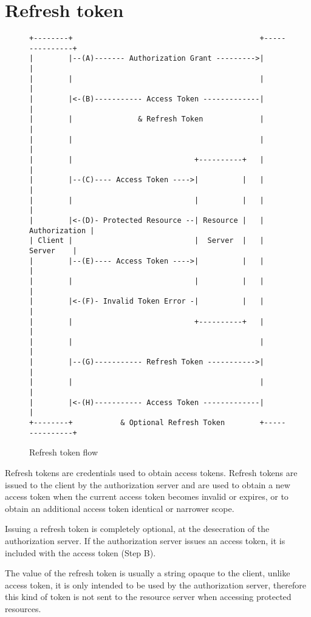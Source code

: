 \section{Refresh token}
\begin{figure}[h]
    \centering
    \begin{BVerbatim}
+--------+                                           +---------------+
|        |--(A)------- Authorization Grant --------->|               |
|        |                                           |               |
|        |<-(B)----------- Access Token -------------|               |
|        |               & Refresh Token             |               |
|        |                                           |               |
|        |                            +----------+   |               |
|        |--(C)---- Access Token ---->|          |   |               |
|        |                            |          |   |               |
|        |<-(D)- Protected Resource --| Resource |   | Authorization |
| Client |                            |  Server  |   |     Server    |
|        |--(E)---- Access Token ---->|          |   |               |
|        |                            |          |   |               |
|        |<-(F)- Invalid Token Error -|          |   |               |
|        |                            +----------+   |               |
|        |                                           |               |
|        |--(G)----------- Refresh Token ----------->|               |
|        |                                           |               |
|        |<-(H)----------- Access Token -------------|               |
+--------+           & Optional Refresh Token        +---------------+
    \end{BVerbatim}
    \caption{Refresh token flow}
\end{figure}

Refresh tokens are credentials used to obtain access tokens. Refresh tokens are
issued to the client by the authorization server and are used to obtain a new
access token when the current access token becomes invalid or expires, or to
obtain an additional access token identical or narrower scope.

Issuing a refresh token is completely optional, at the desecration of the
authorization server.
If the authorization server issues an access token, it is included with the
access token (Step B).

The value of the refresh token is usually a string opaque to the client, unlike
access token, it is only intended to be used by the authorization server,
therefore this kind of token is not sent to the resource server when accessing
protected resources.


